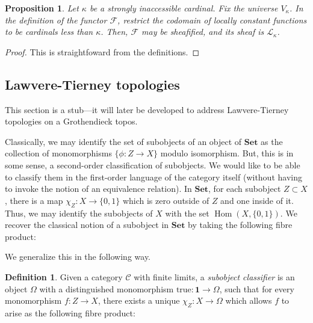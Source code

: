 \documentclass{amsart}
\DeclareMathOperator{\Hom}{Hom}
\newtheorem{proposition}[theorem]{Proposition}
\theoremstyle{definition}
\newtheorem{definition}[theorem]{Definition}
\theoremstyle{remark}
\begin{document}
\begin{proposition}
    Let $\kappa$ be a strongly inaccessible cardinal. Fix the universe
    $V_{\kappa}$. In the definition of the functor $\mathcal{F}$, restrict the
    codomain of locally constant functions to be cardinals less than $\kappa$.
    Then, $\mathcal{F}$ may be sheafified, and its sheaf is
    $\mathcal{L}_{\kappa}$.
\end{proposition}

\begin{proof}
    This is straightfoward from the definitions.
\end{proof}

\subsection{Lawvere-Tierney topologies}

This section is a stub---it will later be developed to address Lawvere-Tierney
topologies on a Grothendieck topos.

Classically, we may identify the set of subobjects of an object of
$\mathbf{Set}$ as the collection of monomorphisms $\{\phi : Z \to X\}$ modulo
isomorphism. But, this is in some sense, a second-order classification of
subobjects. We would like to be able to classify them in the first-order
language of the category itself (without having to invoke the notion of an
equivalence relation). In $\mathbf{Set}$, for each subobject $Z \subset X$,
there is a map $\chi_Z : X \to \{0, 1\}$ which is zero outside of $Z$ and one
inside of it. Thus, we may identify the subobjects of $X$ with the set $\Hom(X,
\{0, 1\})$. We recover the classical notion of a subobject in $\mathbf{Set}$ by
taking the following fibre product:

\begin{center}
\end{center}

We generalize this in the following way.

\begin{definition}
    Given a category $\mathcal{C}$ with finite limits, a \textit{subobject
        classifier} is an object $\Omega$ with a distinguished monomorphism
    $\text{true} : \mathbf{1} \to \Omega$, such that for every monomorphism $f :
    Z \to X$, there exists a unique $\chi_Z : X \to \Omega$ which allows $f$ to
    arise as the following fibre product:
    \begin{center}
    \end{center}
\end{definition}
\end{document}
